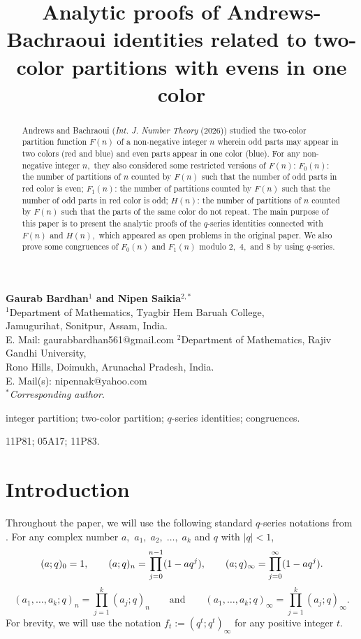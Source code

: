 \documentclass[12pt]{article}
\title{\textbf{Analytic proofs of  Andrews-Bachraoui identities related to two-color partitions with evens in one color}}
\date{}
\numberwithin{equation}{section}
\theoremstyle{definition}
\theoremstyle{remark}
\numberwithin{equation}{section}
\begin{document}
\maketitle

\vspace{-2cm}


\begin{center}
	{\bf Gaurab Bardhan$^1$ and Nipen Saikia$^{2, \ast}$}\\
	$^1$Department of Mathematics, Tyagbir Hem Baruah College,\\ Jamugurihat, Sonitpur, Assam, India.\\
	E. Mail: gaurabbardhan561@gmail.com
	\vskip2mm
	$^2$Department of Mathematics, Rajiv Gandhi
	University,\\ Rono Hills, Doimukh, Arunachal Pradesh, India.\\
	E. Mail(s): nipennak@yahoo.com\\
	$^\ast$\textit{Corresponding author}.\end{center}
\begin{abstract}Andrews and Bachraoui (\textit{Int. J. Number Theory} (2026)) studied the two-color partition function $F(n)$ of a non-negative integer $n$ wherein odd parts may appear in two colors (red and blue) and even parts appear in one color (blue). For any non-negative integer $n,$ they also considered some restricted versions of $F(n)$: $F_0(n)$: the number of partitions of $n$ counted by $F(n)$ such that the number of odd parts  in red color is even; $F_1(n)$: the number of partitions counted by $F(n)$ such that the number of odd parts in red color is odd; $H(n)$: the number of partitions of $n$  counted by $F(n)$ such that the parts of the same color do not repeat. The main purpose of this paper is to present the analytic proofs of the $q$-series identities connected with $F(n)$ and $H(n),$ which appeared as open problems in the original paper. We also prove some congruences of 
$F_0(n)$ and $F_1(n)$ modulo $2,$ $4,$  and $8$ by using $ q $-series.
\end{abstract}

  integer partition; two-color partition; $q$-series identities; congruences.\vskip2mm

11P81; 05A17; 11P83. 

\section{Introduction}Throughout the paper, we will use the following standard $q$-series notations from \cite{andrews, gas}. For any complex number $a,$ $a_1,\;a_2,\;\ldots,\;a_k$ and $q$ with $|q|<1$, 
$$
(a;q)_0=1,\qquad
(a;q)_n=\prod_{j=0}^{n-1}(1-aq^j),\qquad
(a;q)_\infty=\prod_{j=0}^{\infty}(1-aq^j).\notag
$$
$$
(a_1,\ldots,a_k;q)_n=\prod_{j=1}^{k}(a_j;q)_n
\qquad\text{and}\qquad 
(a_1,\ldots,a_k;q)_\infty=\prod_{j=1}^{k}(a_j;q)_\infty.
$$
For brevity, we will use the notation $f_t:=(q^t;q^t)_\infty$
for any positive integer $t$.
\end{document}
